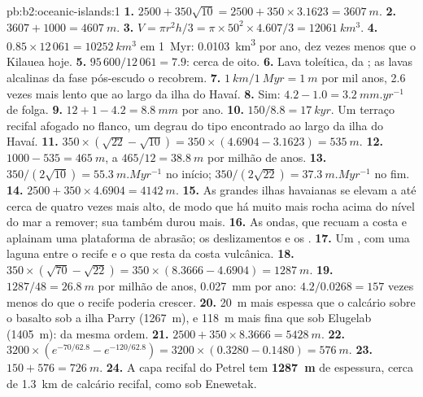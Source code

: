 \begin{solution}{pb:b2:oceanic-islands:1}
\textbf{1.} $2500 + 350\sqrt{10} = 2500 + 350\times3.1623 = \qty{3607}{m}$.
\textbf{2.} $3607 + 1000 = \qty{4607}{m}$.
\textbf{3.} $V = \pi r^2h/3 = \pi\times50^2\times4.607/3 = \qty{12061}{km^3}$.
\textbf{4.} $0.85\times12\,061 = \qty{10252}{km^3}$ em \qty{1}{Myr}: \qty{0.0103}{km^3} por ano,
dez vezes menos que o Kilauea hoje.
\textbf{5.} $95\,600/12\,061 = 7.9$: cerca de oito.
\textbf{6.} Lava toleítica, da ; as lavas alcalinas da fase pós-escudo o
recobrem.
\textbf{7.} $\qty{1}{km}/\qty{1}{Myr} = \qty{1}{m}$ por mil anos, 2.6 vezes mais lento que ao largo
da ilha do Havaí.
\textbf{8.} Sim: $4.2 - 1.0 = \qty{3.2}{mm.yr^{-1}}$ de folga.
\textbf{9.} $12 + 1 - 4.2 = \qty{8.8}{mm}$ por ano.
\textbf{10.} $150/8.8 = \qty{17}{kyr}$. Um terraço recifal afogado no flanco, um degrau do tipo
encontrado ao largo da ilha do Havaí.
\textbf{11.} $350\times(\sqrt{22} - \sqrt{10}) = 350\times(4.6904 - 3.1623) = \qty{535}{m}$.
\textbf{12.} $1000 - 535 = \qty{465}{m}$, a $465/12 = \qty{38.8}{m}$ por milhão de anos.
\textbf{13.} $350/(2\sqrt{10}) = \qty{55.3}{m.Myr^{-1}}$ no início; $350/(2\sqrt{22}) =
\qty{37.3}{m.Myr^{-1}}$ no fim.
\textbf{14.} $2500 + 350\times4.6904 = \qty{4142}{m}$.
\textbf{15.} As grandes ilhas havaianas se elevam a até cerca de quatro vezes mais alto, de modo que há muito mais
rocha acima do nível do mar a remover; sua  também durou mais.
\textbf{16.} As ondas, que recuam a costa e aplainam uma plataforma de abrasão; os deslizamentos e os .
\textbf{17.} Um , com uma laguna entre o recife e o que resta da costa vulcânica.
\textbf{18.} $350\times(\sqrt{70} - \sqrt{22}) = 350\times(8.3666 - 4.6904) = \qty{1287}{m}$.
\textbf{19.} $1287/48 = \qty{26.8}{m}$ por milhão de anos, \qty{0.027}{mm} por ano: $4.2/0.0268 =
157$ vezes menos do que o recife poderia crescer.
\textbf{20.} \qty{20}{m} mais espessa que o calcário sobre o basalto sob a ilha Parry
(\qty{1267}{m}), e \qty{118}{m} mais fina que sob Elugelab (\qty{1405}{m}): da mesma ordem.
\textbf{21.} $2500 + 350\times8.3666 = \qty{5428}{m}$.
\textbf{22.} $3200\times(e^{-70/62.8} - e^{-120/62.8}) = 3200\times(0.3280 - 0.1480) =
\qty{576}{m}$.
\textbf{23.} $150 + 576 = \qty{726}{m}$.
\textbf{24.} A capa recifal do  Petrel tem \textbf{\qty{1287}{m}} de espessura, cerca de \qty{1.3}{km}
de calcário recifal, como sob Enewetak.
\end{solution}
